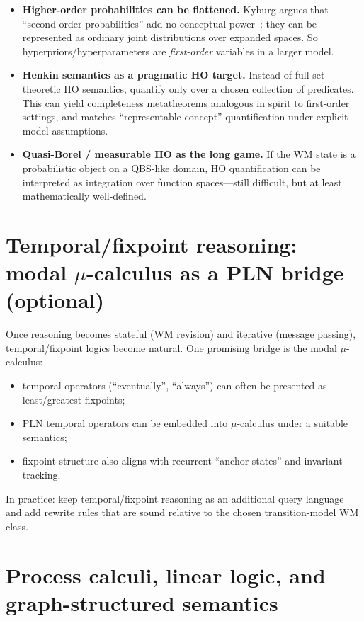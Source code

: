 \documentclass[11pt]{article}
\begin{document}
\begin{itemize}[leftmargin=2em]
\item \textbf{Higher-order probabilities can be flattened.}
Kyburg argues that ``second-order probabilities'' add no conceptual power~\cite{Kyburg}:
they can be represented as ordinary joint distributions over expanded spaces.
So hyperpriors/hyperparameters are \emph{first-order} variables in a larger model.
\item \textbf{Henkin semantics as a pragmatic HO target.}
Instead of full set-theoretic HO semantics, quantify only over a chosen collection of predicates.
This can yield completeness metatheorems analogous in spirit to first-order settings,
and matches ``representable concept'' quantification under explicit model assumptions.
\item \textbf{Quasi-Borel / measurable HO as the long game.}
If the WM state is a probabilistic object on a QBS-like domain, HO quantification can be interpreted
as integration over function spaces---still difficult, but at least mathematically well-defined.
\end{itemize}

\section{Temporal/fixpoint reasoning: modal $\mu$-calculus as a PLN bridge (optional)}

Once reasoning becomes stateful (WM revision) and iterative (message passing), temporal/fixpoint
logics become natural. One promising bridge is the modal $\mu$-calculus:

\begin{itemize}[leftmargin=2em]
\item temporal operators (``eventually'', ``always'') can often be presented as least/greatest fixpoints;
\item PLN temporal operators can be embedded into $\mu$-calculus under a suitable semantics;
\item fixpoint structure also aligns with recurrent ``anchor states'' and invariant tracking.
\end{itemize}

In practice: keep temporal/fixpoint reasoning as an additional query language and add rewrite rules
that are sound relative to the chosen transition-model WM class.

\section{Process calculi, linear logic, and graph-structured semantics}
\end{document}
